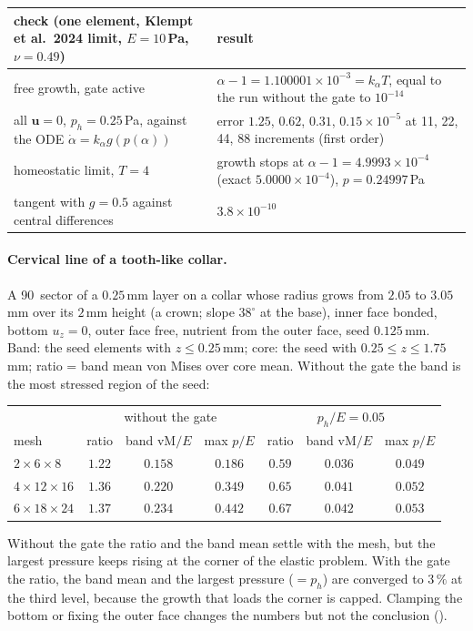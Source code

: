 \documentclass[11pt,a4paper]{article}
\begin{document}
\begin{center}\small
\begin{tabularx}{\linewidth}{@{}Yp{6.2cm}@{}}
\toprule
check (one element, Klempt et al.\ 2024 limit, $E=10$\,Pa, $\nu=0.49$) & result\\
\midrule
free growth, gate active & $\alpha-1=1.100001\times10^{-3}=k_\alpha T$, equal to the run without the gate to $10^{-14}$\\
all $\mathbf u=0$, $p_h=0.25$\,Pa, against the ODE $\dot\alpha=k_\alpha g(p(\alpha))$ & error $1.25$, $0.62$, $0.31$, $0.15\times10^{-5}$ at 11, 22, 44, 88 increments (first order)\\
homeostatic limit, $T=4$ & growth stops at $\alpha-1=4.9993\times10^{-4}$ (exact $5.0000\times10^{-4}$), $p=0.24997$\,Pa\\
tangent with $g=0.5$ against central differences & $3.8\times10^{-10}$\\
\bottomrule
\end{tabularx}
\end{center}

\paragraph{Cervical line of a tooth-like collar.} A 90\textdegree\ sector of a $0.25$\,mm layer on a collar
whose radius grows from $2.05$ to $3.05$\,mm over its $2$\,mm height (a crown; slope $38^\circ$ at the
base), inner face bonded, bottom $u_z=0$, outer face free, nutrient from the outer face, seed $0.125$\,mm.
Band: the seed elements with $z\le0.25$\,mm; core: the seed with $0.25\le z\le1.75$\,mm; ratio = band
mean von Mises over core mean. Without the gate the band is the most stressed region of the seed:
\begin{center}\small
\begin{tabular}{@{}lccc@{\qquad}ccc@{}}
\toprule
& \multicolumn{3}{c}{without the gate} & \multicolumn{3}{c}{$p_h/E=0.05$}\\
mesh & ratio & band vM$/E$ & max $p/E$ & ratio & band vM$/E$ & max $p/E$\\
\midrule
$2\times6\times8$ & $1.22$ & $0.158$ & $0.186$ & $0.59$ & $0.036$ & $0.049$\\
$4\times12\times16$ & $1.36$ & $0.220$ & $0.349$ & $0.65$ & $0.041$ & $0.052$\\
$6\times18\times24$ & $1.37$ & $0.234$ & $0.442$ & $0.67$ & $0.042$ & $0.053$\\
\bottomrule
\end{tabular}
\end{center}
Without the gate the ratio and the band mean settle with the mesh, but the largest pressure keeps
rising at the corner of the elastic problem. With the gate the ratio, the band mean and the largest
pressure ($=p_h$) are converged to $3\,\%$ at the third level, because the growth that loads the corner
is capped. Clamping the bottom or fixing the outer face changes the numbers but not the conclusion
().
\end{document}
